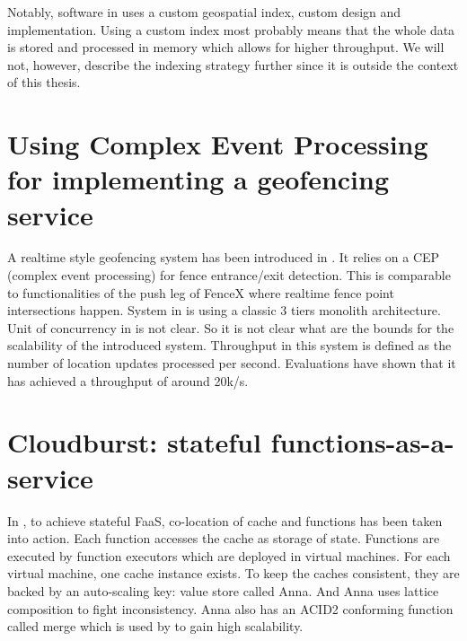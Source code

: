 \documentclass[a4]{report}
\begin{document}
    Notably, software in \cite{Cirillo-Jacobs-Martin-Szczytowski-2014} uses a custom geospatial index,
    custom design and implementation.
    Using a custom index most probably means that the whole data is stored and processed in memory which allows for
    higher throughput.
    We will not, however, describe the indexing strategy further since it is outside the context of this thesis.


    \section{Using Complex Event Processing for implementing a geofencing service}
    A realtime style geofencing system has been introduced in \cite{Nechifor_Comnac_2013}.
    It relies on a CEP (complex event processing) for fence entrance/exit detection.
    This is comparable to functionalities of the push leg of FenceX where realtime fence point intersections happen.
    System in \cite{Nechifor_Comnac_2013} is using a classic 3 tiers monolith architecture.
    Unit of concurrency in \cite{Nechifor_Comnac_2013} is not clear.
    So it is not clear what are the bounds for the scalability of the introduced system.
    Throughput in this system is defined as the number of location updates processed per second.
    Evaluations have shown that it has achieved a throughput of around 20k/s.


    \section{Cloudburst: stateful functions-as-a-service}
    In \cite{Functions-as-a-Service-2020}, to achieve stateful FaaS, co-location of cache and functions has been
    taken into action.
    Each function accesses the cache as storage of state.
    Functions are executed by function executors which are deployed in virtual machines.
    For each virtual machine, one cache instance exists.
    To keep the caches consistent, they are backed by an auto-scaling key: value store called Anna.
    And Anna uses lattice composition to fight inconsistency.
    Anna also has an ACID2 conforming function called merge which is used by \cite{Functions-as-a-Service-2020} to gain high scalability.
\end{document}
